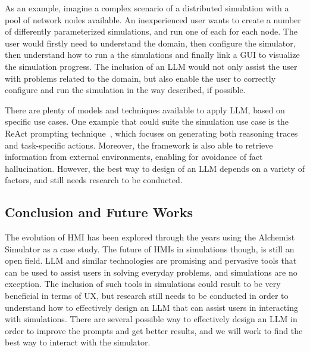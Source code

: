 \documentclass[conference]{IEEEtran}
\begin{document}
As an example,
imagine a complex scenario of a distributed simulation with a pool of network nodes available.
%
An inexperienced user wants to create a number of differently parameterized simulations,
and run one of each for each node.
%
The user would firstly need to understand the domain,
then configure the simulator,
then understand how to run a the simulations and finally link a \ac{GUI} to visualize the simulation progress.
%
The inclusion of an \ac{LLM} would not only assist the user with problems related to the domain,
but also enable the user to correctly configure and run the simulation in the way described,
if possible.
%

There are plenty of models and techniques available to apply \ac{LLM},
based on specific use cases.
%
One example that could suite the simulation use case is the ReAct prompting technique~\cite{DBLP:conf/iclr/YaoZYDSN023},
which focuses on generating both reasoning traces and task-specific actions.
%
Moreover,
the framework is also able to retrieve information from external environments,
enabling for avoidance of fact hallucination.
%
However,
the best way to design of an \ac{LLM} depends on a variety of factors,
and still needs research to be conducted.

\subsection{Conclusion and Future Works}
%
The evolution of HMI has been explored through the years using the Alchemist Simulator as a case study.
%
The future of \acp{HMI} in simulations though, is still an open field.
%
\ac{LLM} and similar technologies are promising and pervasive tools that can be used to assist users in solving everyday problems,
and simulations are no exception.
%
The inclusion of such tools in simulations could result to be very beneficial in terms of \ac{UX},
but research still needs to be conducted in order to understand how to effectively design an \ac{LLM} that can assist users in interacting with simulations.
%
There are several possible way to effectively design an \ac{LLM} in order to improve the prompts and get better results,
and we will work to find the best way to interact with the simulator.



\vspace{12pt}
\end{document}

